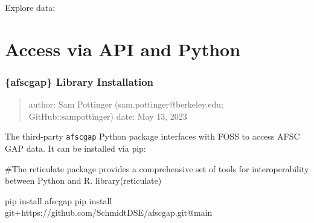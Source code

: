 \documentclass[
  letterpaper,
  oneside,
  open=any]{scrbook}
\newenvironment{Shaded}{\begin{snugshade}}{\end{snugshade}}
\newcommand{\AttributeTok}[1]{\textcolor[rgb]{0.40,0.45,0.13}{#1}}
\newcommand{\CommentTok}[1]{\textcolor[rgb]{0.37,0.37,0.37}{#1}}
\newcommand{\ErrorTok}[1]{\textcolor[rgb]{0.68,0.00,0.00}{#1}}
\newcommand{\FunctionTok}[1]{\textcolor[rgb]{0.28,0.35,0.67}{#1}}
\newcommand{\NormalTok}[1]{\textcolor[rgb]{0.00,0.23,0.31}{#1}}
\newcommand{\OtherTok}[1]{\textcolor[rgb]{0.00,0.23,0.31}{#1}}
\newcommand{\SpecialCharTok}[1]{\textcolor[rgb]{0.37,0.37,0.37}{#1}}
\newcommand{\StringTok}[1]{\textcolor[rgb]{0.13,0.47,0.30}{#1}}
\begin{document}
\begin{Shaded}
\end{Shaded}

Explore data:

\chapter{Access via API and Python}\label{access-via-api-and-python}

\subsection{\{afscgap\} Library
Installation}\label{afscgap-library-installation}

\begin{quote}
author: Sam Pottinger (sam.pottinger@berkeley.edu; GitHub::sampottinger)
date: May 13, 2023
\end{quote}

The third-party \texttt{afscgap} Python package interfaces with FOSS to
access AFSC GAP data. It can be installed via pip:

\begin{Shaded}
\begin{Highlighting}[]
\CommentTok{\#The reticulate package provides a comprehensive set of tools for interoperability between Python and R. }
\FunctionTok{library}\NormalTok{(reticulate)}
\end{Highlighting}
\end{Shaded}

\begin{Shaded}
\begin{Highlighting}[]
\NormalTok{pip install afscgap}
\NormalTok{pip install git}\SpecialCharTok{+}\NormalTok{https}\SpecialCharTok{:}\ErrorTok{//}\NormalTok{github.com}\SpecialCharTok{/}\NormalTok{SchmidtDSE}\SpecialCharTok{/}\NormalTok{afscgap.git}\SpecialCharTok{@}\NormalTok{main}
\end{Highlighting}
\end{Shaded}
\end{document}
